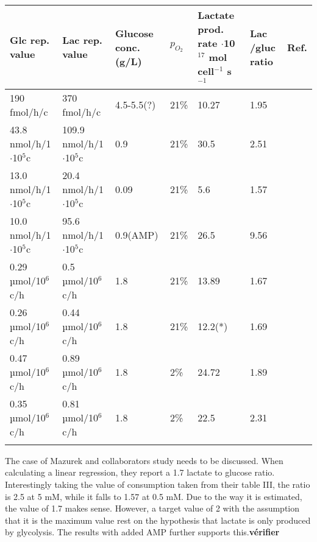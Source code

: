 \documentclass[11pt,a4paper]{article}
\begin{document}
\begin{table}[h!]
\begin{center}
\begin{tabular}{ |p{25mm}|p{25mm}|p{20mm}|p{10mm}|p{20mm}|p{10mm}|p{7mm}| }
 \hline

  \textbf{Glc rep. value} & \textbf{Lac rep.  value} & \textbf{Glucose conc. (g/L)} & $p_{O_2}$ &\textbf{Lactate prod. rate} $\cdot$10$^{17}$ mol cell$^{-1}$ s$^{-1}$  & \textbf{Lac /gluc ratio} & \textbf{Ref}. \\
 \hline
     190 fmol/h/c  & 370 fmol/h/c & 4.5-5.5(?) & 21\% & 10.27 & 1.95 & \cite{Meadows2008}\\
 \hline
      43.8 nmol/h/1$\cdot$10$^{5}$c  & 109.9 nmol/h/1$\cdot$10$^{5}$c & 0.9 & 21\% & 30.5 & 2.51 & \cite{Mazurek1997}\\
 \hline
      13.0 nmol/h/1$\cdot$10$^{5}$c  & 20.4 nmol/h/1$\cdot$10$^{5}$c & 0.09 & 21\% & 5.6 & 1.57  & \cite{Mazurek1997}\\
 \hline
       10.0 nmol/h/1$\cdot$10$^{5}$c  & 95.6 nmol/h/1$\cdot$10$^{5}$c & 0.9(AMP) & 21\% & 26.5 & 9.56 & \cite{Mazurek1997}\\
 \hline
       0.29 µmol/10$^6$c/h  & 0.5 µmol/10$^6$c/h & 1.8 & 21\% & 13.89 & 1.67 & \cite{Prado-Garcia2020}\\
 \hline
        0.26 µmol/10$^6$c/h  & 0.44 µmol/10$^6$c/h & 1.8 & 21\% & 12.2(*) & 1.69 & \cite{Prado-Garcia2020}\\
 \hline
         0.47 µmol/10$^6$c/h  & 0.89 µmol/10$^6$c/h & 1.8 & 2\% & 24.72 & 1.89 & \cite{Prado-Garcia2020}\\
 \hline
          0.35 µmol/10$^6$c/h  & 0.81 µmol/10$^6$c/h & 1.8 & 2\% & 22.5 & 2.31 & \cite{Prado-Garcia2020}\\
 \hline
             &  &  &  &  &  & \cite{Bayar2021}\\
 \hline

\end{tabular}
\end{center}
\end{table}

The case of Mazurek and collaborators study needs to be discussed. When calculating a linear regression, they report a 1.7 lactate to glucose ratio. Interestingly taking the value of consumption taken from their table III, the ratio is 2.5 at 5 mM, while it falls to 1.57 at 0.5 mM. Due to the way it is estimated, the value of 1.7 makes sense. However, a target value of 2 with the assumption that it is the maximum value rest on the hypothesis that lactate is only produced by glycolysis. The results with added AMP further supports this.\textbf{vérifier}
\end{document}
